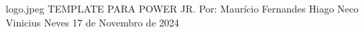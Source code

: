 \documentclass[a4paper, 12pt]{article}
\begin{document}
\capapower
    {logo.jpeg} %
    {TEMPLATE PARA POWER JR.} %
    {Por: Maurício Fernandes} %
    {Hiago Neco} %
    {Vinicius Neves} %
    {17 de Novembro de 2024} %

\NoBgThispage
\imprimirgotadagua

\imprimircontracapa

\imprimirlistadetabelas
\imprimirlistadeilustracoes
\imprimirsumario

\imprimirrodape


\end{document}
